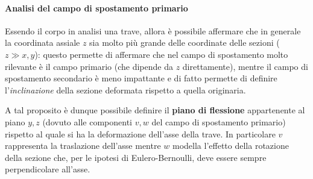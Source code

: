 		\paragraph{Analisi del campo di spostamento primario} Essendo il corpo in analisi una trave, allora è possibile affermare che in generale la coordinata assiale $z$ sia molto più grande delle coordinate delle sezioni ($z\gg x,y$): questo permette di affermare che nel campo di spostamento molto rilevante è il campo primario (che dipende da $z$ direttamente), mentre il campo di spostamento secondario è meno impattante e di fatto permette di definire l'\textit{inclinazione} della sezione deformata rispetto a quella originaria.
		
		A tal proposito è dunque possibile definire il \textbf{piano di flessione} appartenente al piano $y,z$ (dovuto alle componenti $v,w$ del campo di spostamento primario) rispetto al quale si ha la deformazione dell'asse della trave. In particolare $v$ rappresenta la traslazione dell'asse mentre $w$ modella l'effetto della rotazione della sezione che, per le ipotesi di Eulero-Bernoulli, deve essere sempre perpendicolare all'asse.
		
